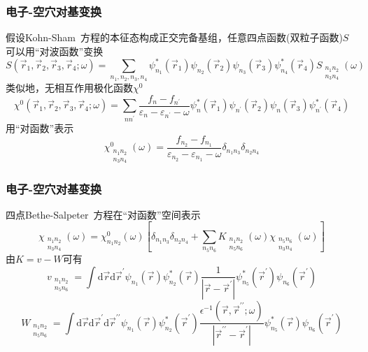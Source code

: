 \documentclass[cjk,slidestop,compress,mathserif,blue]{beamer}
\begin{document}
\frame
{
	\frametitle{电子-空穴对基变换}
	假设\textrm{Kohn-Sham~}方程的本征态构成正交完备基组，任意四点函数(双粒子函数)$S$可以用“对波函数”变换
	\begin{displaymath}
		S(\vec r_1,\vec r_2,\vec r_3,\vec r_4;\omega)=\sum_{n_1,n_2,n_3,n_4}\psi_{n_1}^{\ast}(\vec r_1)\psi_{n_2}(\vec r_2)\psi_{n_3}(\vec r_3)\psi_{n_4}^{\ast}(\vec r_4)S_{\substack{n_1 n_2\\n_3 n_4 }}(\omega)
	\end{displaymath}
	类似地，无相互作用极化函数$\chi^0$
	\begin{displaymath}
		\chi^0(\vec r_1,\vec r_2,\vec r_3,\vec r_4;\omega)=\sum_{nn^{\prime}}\frac{f_n-f_{n^{\prime}}}{\varepsilon_n-\varepsilon_{n^{\prime}}-\omega}\psi_n^{\ast}(\vec r_1)\psi_{n^{\prime}}(\vec r_2)\psi_n(\vec r_3)\psi_{n^{\prime}}^{\ast}(\vec r_4)
	\end{displaymath}
用“对函数”表示
\begin{displaymath}
	\chi_{ \substack {n_1 n_2\\n_3 n_4}  }^0
		(\omega)=\frac{f_{n_2}-f_{n_1}}{\varepsilon_{n_2}-\varepsilon_{n_1}-\omega}\delta_{n_1n_3}\delta_{n_2n_4}
\end{displaymath}
}

\frame
{
	\frametitle{电子-空穴对基变换}
	四点\textrm{Bethe-Salpeter~}方程在“对函数”空间表示
	\begin{displaymath}
		\chi_{ \substack{ n_1 n_2\\n_3 n_4 } }
		(\omega)=\chi_{n_1n_2}^0(\omega)\left[ \delta_{n_1n_3}\delta_{n_2n_4}+\sum_{n_5n_6}K_{
			\substack{	n_1 n_2\\ n_5 n_6 } }
			(\omega)\chi_{
				\substack{ n_5 n_6\\ n_3 n_4 } }(\omega)
			\right]
	\end{displaymath}
	由$K=v-W$可有
	\begin{displaymath}
		v_{
			\substack{ n_1 n_2\\ n_5 n_6 } }
			=\int\mathrm{d}\vec r\mathrm{d}\vec r^{\prime}\psi_{n_1}(\vec r)\psi_{n_2}^{\ast}(\vec r)\frac1{|\vec r-\vec r^{\prime}|}\psi_{n_5}^{\ast}(\vec r^{\prime})\psi_{n_6}(\vec r^{\prime})
	\end{displaymath}
	\begin{displaymath}
		W_{
			\substack{
				n_1 n_2\\
				n_5 n_6
			} }=\int\mathrm{d}\vec r\mathrm{d}\vec r^{\prime}\mathrm{d}\vec r^{\prime\prime}\psi_{n_1}(\vec r)\psi_{n_2}^{\ast}(\vec r^{\prime})\frac{\epsilon^{-1}(\vec r,\vec r^{\prime\prime};\omega)}{|\vec r^{\prime\prime}-\vec r^{\prime}|}\psi_{n_5}^{\ast}(\vec r)\psi_{n_6}(\vec r^{\prime})
	\end{displaymath}
}
\end{document}
